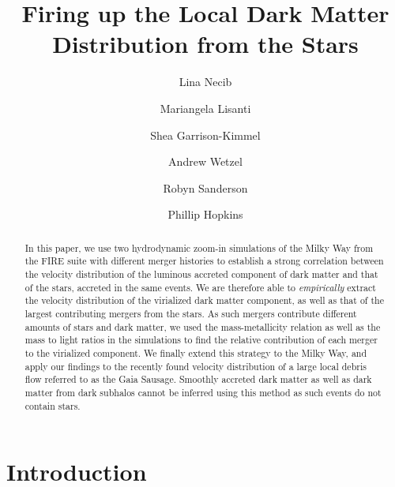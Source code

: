 \documentclass[twocolumn,preprintnumbers]{aastex6}
\begin{document}
\title{
Firing up the Local Dark Matter Distribution from the Stars
}

\author{Lina Necib}


\author{Mariangela Lisanti}

\author{Shea Garrison-Kimmel}
\author{Andrew Wetzel}
\author{Robyn Sanderson}
\author{Phillip Hopkins}

\begin{abstract}
In this paper, we use two hydrodynamic zoom-in simulations of the Milky Way from the FIRE suite with different merger histories to establish a strong correlation between the velocity distribution of the luminous accreted component of dark matter and that of the stars, accreted in the same events. We are therefore able to \emph{empirically} extract the velocity distribution of the virialized dark matter component, as well as that of the largest contributing mergers from the stars. As such mergers contribute different amounts of stars and dark matter,  we used the mass-metallicity relation as well as the mass to light ratios in the simulations to find the relative contribution of each merger to the virialized component. We finally extend this strategy to the Milky Way, and apply our findings to the recently found velocity distribution of a large local debris flow referred to as the Gaia Sausage. Smoothly accreted dark matter as well as dark matter from dark subhalos cannot be inferred using this method as such events do not contain stars.
\end{abstract}
\maketitle
\pagebreak

\section{Introduction} 
\label{sec:intro}
\end{document}
